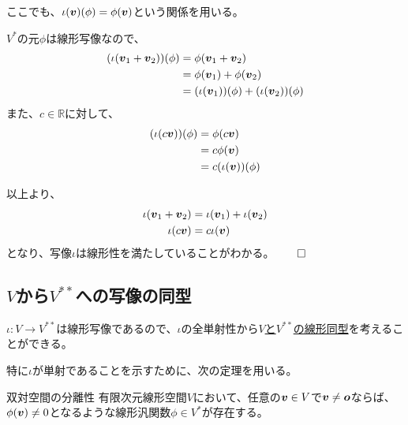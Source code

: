 \documentclass[../../../topic_linear-algebra]{subfiles}
\begin{document}
\begin{handout}
  ここでも、$\iota(\vb*{v})(\phi) = \phi(\vb*{v})$という関係を用いる。
  
  \br
  
  $V^*$の元$\phi$は線形写像なので、
  \begin{align*}
    (\iota(\vb*{v}_1 + \vb*{v}_2))(\phi) &= \phi(\vb*{v}_1 + \vb*{v}_2) \\
    &= \phi(\vb*{v}_1) + \phi(\vb*{v}_2) \\
    &= (\iota(\vb*{v}_1))(\phi) + (\iota(\vb*{v}_2))(\phi)
  \end{align*}
  また、$c \in \mathbb{R}$に対して、
  \begin{align*}
    (\iota(c\vb*{v}))(\phi) &= \phi(c\vb*{v}) \\
    &= c\phi(\vb*{v}) \\
    &= c(\iota(\vb*{v}))(\phi)
  \end{align*}
  
  以上より、
  \begin{align*}
    \iota(\vb*{v}_1 + \vb*{v}_2) &= \iota(\vb*{v}_1) + \iota(\vb*{v}_2) \\
    \iota(c\vb*{v}) &= c\iota(\vb*{v})
  \end{align*}
  となり、写像$\iota$は線形性を満たしていることがわかる。$\qed$
\end{handout}

\subsection{$V$から$V^{**}$への写像の同型}

$\iota \colon V \to V^{**}$は線形写像であるので、$\iota$の全単射性から\hyperref[def:linear-subspace-isomorphism]{$V$と$V^{**}$の線形同型}を考えることができる。

\br

特に$\iota$が単射であることを示すために、次の定理を用いる。

\begin{theorem}{双対空間の分離性}\label{thm:dual-space-separation}
  有限次元線形空間$V$において、任意の$\vb*{v} \in V$で$\vb*{v} \neq \vb*{o}$ならば、$\phi(\vb*{v}) \neq 0$となるような線形汎関数$\phi \in V^*$が存在する。
\end{theorem}
\end{document}
